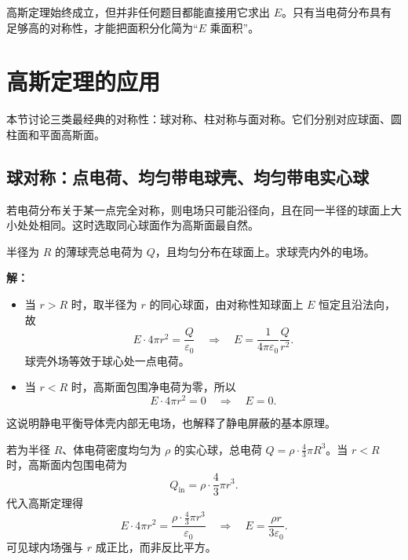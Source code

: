 \begin{remark}
高斯定理始终成立，但并非任何题目都能直接用它求出 $E$。只有当电荷分布具有足够高的对称性，才能把面积分化简为“$E$ 乘面积”。
\end{remark}

\section{高斯定理的应用}

本节讨论三类最经典的对称性：球对称、柱对称与面对称。它们分别对应球面、圆柱面和平面高斯面。

\subsection*{球对称：点电荷、均匀带电球壳、均匀带电实心球}

若电荷分布关于某一点完全对称，则电场只可能沿径向，且在同一半径的球面上大小处处相同。这时选取同心球面作为高斯面最自然。

\begin{example}[均匀带电薄球壳的电场]
半径为 $R$ 的薄球壳总电荷为 $Q$，且均匀分布在球面上。求球壳内外的电场。

\textbf{解：}
\begin{itemize}
  \item 当 $r>R$ 时，取半径为 $r$ 的同心球面，由对称性知球面上 $E$ 恒定且沿法向，故
  \begin{equation}
  E\cdot 4\pi r^2 = \frac{Q}{\varepsilon_0}
  \quad\Rightarrow\quad
  E = \frac{1}{4\pi\varepsilon_0}\frac{Q}{r^2}.
  \end{equation}
  球壳外场等效于球心处一点电荷。
  \item 当 $r<R$ 时，高斯面包围净电荷为零，所以
  \begin{equation}
  E\cdot 4\pi r^2 = 0 \quad\Rightarrow\quad E=0.
  \end{equation}
\end{itemize}
这说明静电平衡导体壳内部无电场，也解释了静电屏蔽的基本原理。
\end{example}

若为半径 $R$、体电荷密度均匀为 $\rho$ 的实心球，总电荷 $Q=\rho\cdot \frac{4}{3}\pi R^3$。当 $r<R$ 时，高斯面内包围电荷为
\begin{equation}
Q_{\text{in}} = \rho\cdot \frac{4}{3}\pi r^3.
\end{equation}
代入高斯定理得
\begin{equation}
E\cdot 4\pi r^2 = \frac{\rho \cdot \frac{4}{3}\pi r^3}{\varepsilon_0}
\quad\Rightarrow\quad
E = \frac{\rho r}{3\varepsilon_0}.
\end{equation}
可见球内场强与 $r$ 成正比，而非反比平方。

